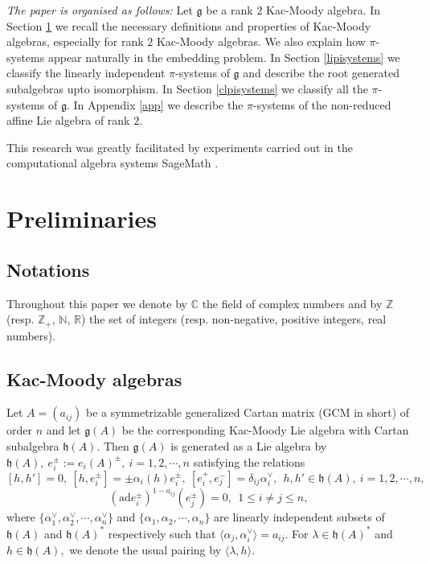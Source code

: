 \documentclass[12pt,reqno]{amsart}
\theoremstyle{plain}
\theoremstyle{definition}
\theoremstyle{remark}
\newcommand{\lie}[1]{\mathfrak{#1}}
\begin{document}
 \noindent \textit{The paper is organised as follows:} Let $\lie g$ be a rank $2$ Kac-Moody algebra. In Section \ref{secprelim} we recall the necessary definitions and properties of Kac-Moody algebras, especially for rank $2$ Kac-Moody algebras. We also explain how $\pi$-systems appear naturally in the embedding problem. In Section \ref{lipisystems} we classify the linearly independent $\pi$-systems of $\lie g$ and describe the root generated subalgebras upto isomorphism. In Section \ref{clpisystems} we classify all the $\pi$-systems of $\lie g.$ In Appendix \ref{app} we describe the $\pi$-systems of the non-reduced affine Lie algebra of rank $2.$

 This research was greatly facilitated by experiments carried out in the computational algebra systems SageMath \cite{sagemath}.





\section{Preliminaries}\label{secprelim}
\subsection{Notations} Throughout this paper we denote by $\mathbb{C}$ the field of complex numbers and by $\mathbb{Z}$ (resp. $\mathbb{Z}_{+}$, $\mathbb{N}$, $\mathbb{R}$) the set of integers (resp. non-negative, positive integers, real numbers). 

\subsection{Kac-Moody algebras} Let $A=(a_{ij})$ be a symmetrizable generalized Cartan matrix (GCM in short) of order $n$ and let $\lie g(A)$ be the corresponding Kac-Moody Lie algebra with Cartan subalgebra $\lie h(A)$. Then $\lie g(A)$ is generated as a Lie algebra by $\lie h(A),\ e_i^{\pm}:=e_i(A)^\pm,\ i=1,2,\cdots,n$ satisfying the relations
$$[h,h']=0,\ [h,e_i^\pm]=\pm\alpha_i(h)e_i^\pm,\ [e_i^+,e_j^-]=\delta_{ij}\alpha_i^\vee,\ \ h,h'\in\lie h(A),\ i=1,2,\cdots,n,$$
$$(\mathrm{ad}e_{i}^\pm)^{1-a_{ij}}(e_j^\pm)=0,\ \ 1\le i\neq j\le n,$$ where $\{\alpha_1^\vee,\alpha_2^\vee,\cdots,\alpha_n^\vee\}$ and $\{\alpha_1,\alpha_2,\cdots,\alpha_n\}$ are linearly independent subsets of $\lie h(A)$ and $\lie h(A)^*$ respectively such that $\langle \alpha_j,\alpha_i^\vee\rangle=a_{ij}.$ For $\lambda\in\lie h(A)^*$ and $h\in \lie h(A),$ we denote the usual pairing by $\langle \lambda,h\rangle.$
\end{document}
